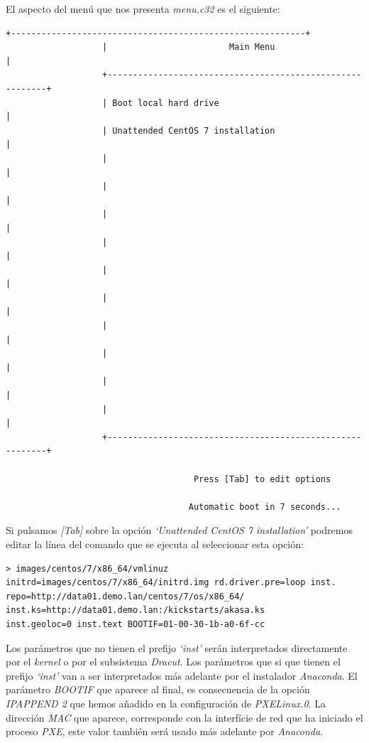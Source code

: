 \documentclass[a4paper,12pt,spanish,final]{epsc_tfc_pfc}
\begin{document}
El aspecto del menú que nos presenta \emph{menu.c32} es el siguiente:\\

\begin{lstlisting}[style=dnsmasq]
                   +----------------------------------------------------------+
                   |                        Main Menu                         |
                   +----------------------------------------------------------+
                   | Boot local hard drive                                    |
                   | Unattended CentOS 7 installation                         |
                   |                                                          |
                   |                                                          |
                   |                                                          |
                   |                                                          |
                   |                                                          |
                   |                                                          |
                   |                                                          |
                   |                                                          |
                   |                                                          |
                   |                                                          |
                   +----------------------------------------------------------+

                                     Press [Tab] to edit options

                                    Automatic boot in 7 seconds...
\end{lstlisting}

Si pulsamos \emph{[Tab]} sobre la opción \emph{`Unattended CentOS 7 installation'} podremos editar la línea del comando que se ejecuta al seleccionar esta opción:\\

\begin{lstlisting}[style=dnsmasq]
> images/centos/7/x86_64/vmlinuz initrd=images/centos/7/x86_64/initrd.img rd.driver.pre=loop inst.
repo=http://data01.demo.lan/centos/7/os/x86_64/ inst.ks=http://data01.demo.lan:/kickstarts/akasa.ks
inst.geoloc=0 inst.text BOOTIF=01-00-30-1b-a0-6f-cc
\end{lstlisting}

Los parámetros que no tienen el prefijo \emph{`inst'} serán interpretados directamente por el \emph{kernel} o por el subsistema \emph{Dracut}. Los parámetros que si que tienen el prefijo \emph{`inst'} van a ser interpretados más adelante por el instalador \emph{Anaconda}. El parámetro \emph{BOOTIF} que aparece al final, es consecuencia de la opción \emph{IPAPPEND 2} que hemos añadido en la configuración de \emph{PXELinux.0}. La dirección \emph{MAC} que aparece, corresponde con la interfície de red que ha iniciado el proceso \emph{PXE}, este valor también será usado más adelante por \emph{Anaconda}.
\end{document}

